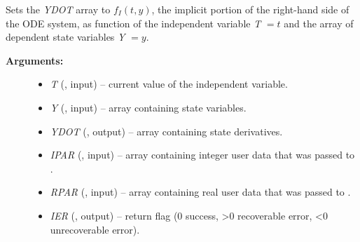 \documentclass[letterpaper,10pt,english]{sphinxmanual}
\begin{document}
\begin{fulllineitems}
\label{f_interface/Usage:f/_/FARKIFUN}
Sets the \emph{YDOT} array to \(f_I(t,y)\), the implicit portion of
the right-hand side of the ODE system, as function of the
independent variable \emph{T} \(=t\) and the array of dependent state
variables \emph{Y} \(=y\).
\begin{description}
\item[{\textbf{Arguments:}}] \leavevmode\begin{itemize}
\item {} 
\emph{T} (, input) -- current value of the independent variable.

\item {} 
\emph{Y} (, input) -- array containing state variables.

\item {} 
\emph{YDOT} (, output) -- array containing state derivatives.

\item {} 
\emph{IPAR} (, input) -- array containing integer user
data that was passed to {\hyperref[f_interface/Usage:f/_/FARKMALLOC]{\emph{}}}.

\item {} 
\emph{RPAR} (, input) -- array containing real user
data that was passed to {\hyperref[f_interface/Usage:f/_/FARKMALLOC]{\emph{}}}.

\item {} 
\emph{IER} (, output) -- return flag (0 success, \textgreater{}0
recoverable error, \textless{}0 unrecoverable error).

\end{itemize}

\end{description}

\end{fulllineitems}

\end{document}
